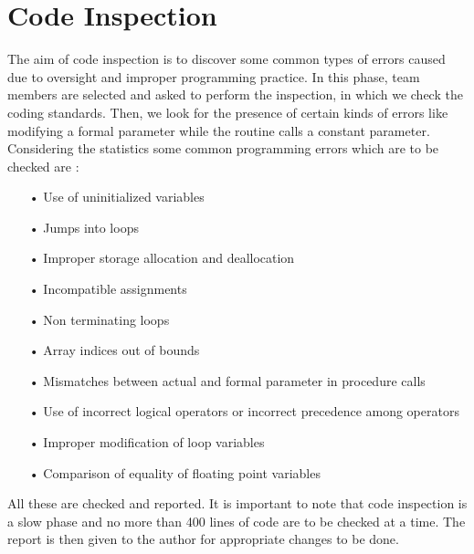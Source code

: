 \documentclass{scrreprt}
\begin{document}
\section{Code Inspection}
The aim of code inspection is to discover some common types of errors caused due to oversight and improper programming practice. In this phase, team
members are selected and asked to perform the inspection, in which we check the coding standards. Then, we look for the presence of certain kinds of errors like modifying a formal parameter while the routine calls a constant parameter. Considering the statistics some common
programming errors which are to be checked are :
\begin{itemize}
\item[•] Use of uninitialized variables
\item[•] Jumps into loops
\item[•] Improper storage allocation and deallocation
\item[•] Incompatible assignments
\item[•] Non terminating loops
\item[•] Array indices out of bounds
\item[•] Mismatches between actual and formal parameter in procedure calls
\item[•] Use of incorrect logical operators or incorrect precedence among operators
\item[•] Improper modification of loop variables
\item[•] Comparison of equality of floating point variables
\end{itemize}

All these are checked and reported. It is important to note that code inspection is
a slow phase and no more than 400 lines of code are to be checked at a
time. The report is then given to the author for appropriate changes to be
done.
\end{document}

